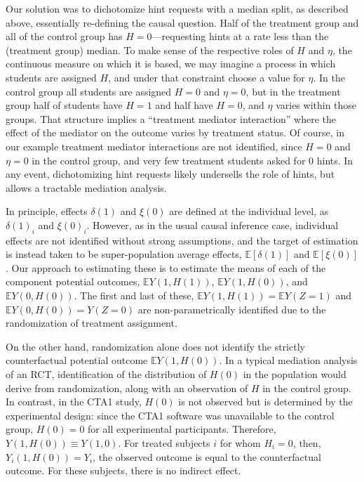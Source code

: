 \documentclass{article}
\newcommand{\EE}{\mathbb{E}}
\begin{document}
Our solution was to dichotomize hint requests with a median split, as
described above, essentially re-defining the causal question.
Half of the treatment group and all of the control group has
$H=0$---requesting hints at a rate less than the (treatment group)
median.
To make sense of the respective roles of $H$ and $\eta$, the
continuous measure on which it is based, we may imagine a process in
which students are assigned $H$, and under that constraint choose a
value for $\eta$.
In the control group all students are assigned $H=0$ and $\eta=0$, but
in the treatment group half of students have $H=1$ and half have
$H=0$, and $\eta$ varies within those groups.
That structure implies a ``treatment mediator interaction''
where the effect of the mediator on the outcome varies by treatment
status.
Of course, in our example treatment mediator interactions are not
identified, since $H=0$ and $\eta=0$ in the control group, and very
few treatment students asked for 0 hints.
In any event, dichotomizing hint requests likely undersells the role
of hints, but allows a tractable mediation analysis.

In principle, effects $\delta(1)$ and $\xi(0)$ are defined at the
individual level, as $\delta(1)_i$ and $\xi(0)_i$.
However, as in the usual causal inference case, individual effects are
not identified without strong assumptions, and the target of
estimation is instead taken to be super-population average effects,
$\EE[\delta(1)]$ and $\EE[\xi(0)]$. Our approach to estimating these
is to estimate the means of each of the component potential outcomes,
$\EE Y(1,H(1))$, $\EE Y(1,H(0))$, and $\EE Y(0,H(0))$.
The first and last of these, $\EE Y(1,H(1))=\EE Y(Z=1)$ and $\EE
Y(0,H(0))=Y(Z=0)$ are non-parametrically identified due to the
randomization of treatment assignment.

On the other hand, randomization alone does not identify the strictly counterfactual
potential outcome $\EE Y(1,H(0))$.
In a typical mediation analysis of an RCT, identification of the
distribution of $H(0)$ in the population would derive from
randomization, along with an observation of $H$ in the control group.
In contrast, in the CTA1 study, $H(0)$ is not observed but is
determined by the experimental design: since the CTA1 software was
unavailable to the control group, $H(0)=0$ for all experimental
participants.
Therefore, $Y(1,H(0))\equiv Y(1,0)$.
For treated subjects $i$ for whom $H_i=0$, then, $Y_i(1,H(0))=Y_i$,
the observed outcome is equal to the counterfactual outcome.
For these subjects, there is no indirect effect.
\end{document}
